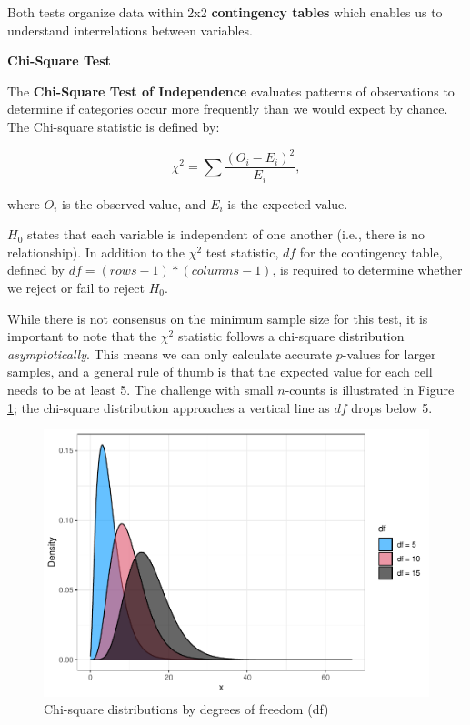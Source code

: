 \documentclass[
]{book}
\begin{document}
Both tests organize data within 2x2 \textbf{contingency tables} which enables us to understand interrelations between variables.

\textbf{Chi-Square Test}

The \textbf{Chi-Square Test of Independence} evaluates patterns of observations to determine if categories occur more frequently than we would expect by chance. The Chi-square statistic is defined by:

\[ {\chi}^2 = \sum\frac{(O_i - E_i)^2}{E_i}, \]

where \(O_i\) is the observed value, and \(E_i\) is the expected value.

\(H_0\) states that each variable is independent of one another (i.e., there is no relationship). In addition to the \({\chi}^2\) test statistic, \(df\) for the contingency table, defined by \(df = (rows - 1) * (columns - 1)\), is required to determine whether we reject or fail to reject \(H_0\).

While there is not consensus on the minimum sample size for this test, it is important to note that the \({\chi}^2\) statistic follows a chi-square distribution \emph{asymptotically}. This means we can only calculate accurate \(p\)-values for larger samples, and a general rule of thumb is that the expected value for each cell needs to be at least 5. The challenge with small \(n\)-counts is illustrated in Figure \ref{fig:chisq-dist}; the chi-square distribution approaches a vertical line as \(df\) drops below 5.

\begin{figure}

{\centering \includegraphics[width=1\linewidth]{The_Fundamentals_of_People_Analytics_files/figure-latex/chisq-dist-1} 

}

\caption{Chi-square distributions by degrees of freedom (df)}\label{fig:chisq-dist}
\end{figure}
\end{document}
